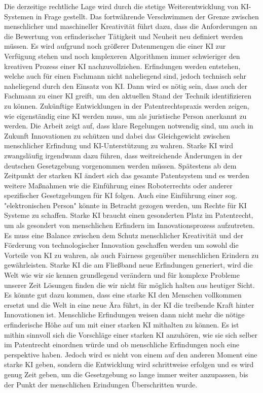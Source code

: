 Die derzeitige rechtliche Lage wird durch die 
stetige Weiterentwicklung von KI-Systemen in Frage
gestellt. Das fortwährende Verschwimmen der 
Grenze zwischen menschlicher und maschineller Kreativität
führt dazu, dass die Anforderungen an die Bewertung von 
erfinderischer Tätigkeit und Neuheit neu definiert
werden müssen. Es wird aufgrund noch größerer Datenmengen die einer 
KI zur Verfügung stehen und noch kmplexeren Algorithmen
immer schwieriger den kreativen Prozess einer KI 
nachzuvollziehen. Erfindungen werden entstehen, welche
auch für einen Fachmann nicht naheliegend sind, jedoch 
technisch sehr naheliegend durch den Einsatz von KI.
Dann wird es nötig sein, dass auch der Fachmann zu einer
KI greift, um den aktuellen Stand der Technik identifizieren
zu können. 
Zukünftige Entwicklungen in der Patentrechtspraxis werden zeigen, 
wie eigenständig eine KI werden muss, 
um als juristische Person anerkannt zu werden. 
Die Arbeit zeigt auf, dass klare Regelungen notwendig sind, 
um auch in Zukunft Innovationen zu schützen 
und dabei das Gleichgewicht zwischen 
menschlicher Erfindung und KI-Unterstützung zu wahren.
Starke KI wird zwangsläufig irgendwann dazu 
führen, dass weitreichende Änderungen in der deutschen
Gesetzgebung vorgenommen werden müssen. 
Spätestens ab dem Zeitpunkt der starken KI ändert sich 
das gesamte Patentsystem und es werden weitere 
Maßnahmen wie die Einführung eines Roboterrechts oder
anderer spezifischer Gesetzgebungen für KI folgen. 
Auch eine Einführung einer sog. "elektronischen
Person" könnte in Betracht gezogen werden, um
Rechte für KI Systeme zu schaffen.
Starke KI braucht einen gesonderten Platz im 
Patentrecht, um als gesondert von menschlichen Erfindern
im Innovationsprozess aufzutreten.
Es muss eine Balance zwischen dem Schutz menschlicher Kreativität 
und der Förderung von technologischer Innovation geschaffen werden
um sowohl die Vorteile von KI zu wahren, als 
auch Fairness gegenüber menschlichen Erindern zu 
gewährleisten. Starke KI die am Fließband neue
Erfindungen generiert, wird die Welt wie wir sie 
kennen grundlegend verändern und für komplexe Probleme
unserer Zeit Lösungen finden die wir nicht für möglich
halten aus heutiger Sicht. Es könnte gut dazu kommen,
dass eine starke KI den Menschen vollkommen
ersetzt und die Welt in eine neue Ära führt, in der
KI die treibende Kraft hinter Innovationen ist.
Menschliche Erfindungen weisen dann nicht mehr die 
nötige erfinderische Höhe auf um mit einer starken
KI mithalten zu können. Es ist mithin sinnvoll sich die 
Vorschläge einer starken KI anzuhören, wie sie sich
selber im Patentrecht einordnen würde und ob menschliche
Erfindungen noch eine perspektive haben. Jedoch wird
es nicht von einem auf den anderen Moment eine starke KI
geben, sondern die Entwicklung wird schrittweise erfolgen
und es wird genug Zeit geben, um die Gesetzgebung so
lange immer weiter anzupassen,
bis der Punkt der menschlichen Erindungen Überschritten wurde.



